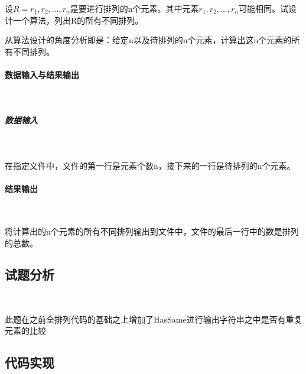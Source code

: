 \documentclass[UTF8]{ctexart}
\begin{document}
   设$R={r_1,r_2,...,r_n}$是要进行排列的n个元素。其中元素$r_1,r_2,...,r_n$可能相同。试设计一个算法，列出R的所有不同排列。

   从算法设计的角度分析即是：给定n以及待排列的n个元素，计算出这n个元素的所有不同排列。

   \paragraph{数据输入与结果输出}

   ~

   \subparagraph{数据输入}

   ~

   在指定文件中，文件的第一行是元素个数n，接下来的一行是待排列的n个元素。

   \paragraph{结果输出}

   ~

   将计算出的n个元素的所有不同排列输出到文件中，文件的最后一行中的数是排列的总数。

   \subsection{试题分析}

   ~

   此题在之前全排列代码的基础之上增加了HasSame进行输出字符串之中是否有重复元素的比较

   \subsection{代码实现}

   ~
\end{document}
